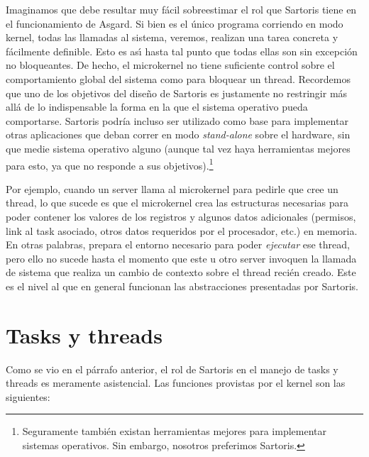 \documentclass[11pt, letterpaper, twoside]{book}
\begin{document}
Imaginamos que debe resultar muy f\'acil sobreestimar el rol que Sartoris tiene en el funcionamiento de Asgard. Si bien es el \'unico programa corriendo en modo kernel, todas las llamadas al sistema, veremos, realizan una tarea concreta y f\'acilmente definible. Esto es as\'\i{} hasta tal punto que todas ellas son sin excepci\'on no bloqueantes. De hecho, el microkernel no tiene suficiente control sobre el comportamiento global del sistema como para bloquear un thread. Recordemos que uno de los objetivos del dise\~no de Sartoris es justamente no restringir m\'as all\'a de lo indispensable la forma en la que el sistema operativo pueda comportarse. Sartoris podr\'ia incluso ser utilizado como base para implementar otras aplicaciones que deban correr en modo \emph{stand-alone} sobre el hardware, sin que medie sistema operativo alguno (aunque tal vez haya herramientas mejores para esto, ya que no responde a sus objetivos).\footnote{Seguramente tambi\'en existan herramientas mejores para implementar sistemas operativos. Sin embargo, nosotros preferimos Sartoris.}

Por ejemplo, cuando un server llama al microkernel para pedirle que cree un thread, lo que sucede es que el microkernel crea las estructuras necesarias para poder contener los valores de los registros y algunos datos adicionales (permisos, link al task asociado, otros datos requeridos por el procesador, etc.)  en memoria. En otras palabras, prepara el entorno necesario para poder \emph{ejecutar} ese thread, pero ello no sucede hasta el momento que este u otro server invoquen la llamada de sistema que realiza un cambio de contexto sobre el thread reci\'en creado. Este es el nivel al que en general funcionan las abstracciones presentadas por Sartoris.

\section{Tasks y threads}

Como se vio en el p\'arrafo anterior, el rol de Sartoris en el manejo de tasks y threads es meramente asistencial. Las funciones provistas por el kernel son las siguientes:
\end{document}
